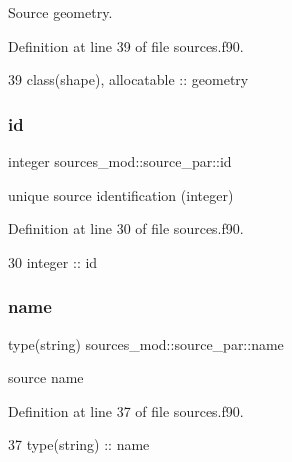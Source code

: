Source geometry. 



Definition at line 39 of file sources.\+f90.


\begin{DoxyCode}
39         \textcolor{keywordtype}{class}(shape), \textcolor{keywordtype}{allocatable} :: geometry
\end{DoxyCode}
\mbox{\label{structsources__mod_1_1source__par_a88d333946d18fee527b7b207f44dd3ff}} 
\subsubsection{\texorpdfstring{id}{id}}
{\footnotesize\ttfamily integer sources\+\_\+mod\+::source\+\_\+par\+::id\hspace{0.3cm}{\ttfamily [private]}}



unique source identification (integer) 



Definition at line 30 of file sources.\+f90.


\begin{DoxyCode}
30         \textcolor{keywordtype}{integer} :: id
\end{DoxyCode}
\mbox{\label{structsources__mod_1_1source__par_ac56d7761e7da3a906a3f0fbf4c7f49f8}} 
\subsubsection{\texorpdfstring{name}{name}}
{\footnotesize\ttfamily type(string) sources\+\_\+mod\+::source\+\_\+par\+::name\hspace{0.3cm}{\ttfamily [private]}}



source name 



Definition at line 37 of file sources.\+f90.


\begin{DoxyCode}
37         \textcolor{keywordtype}{type}(string) :: name
\end{DoxyCode}
\mbox{\label{structsources__mod_1_1source__par_ae236b50563bb0dadd55af1aadac3023e}} 
